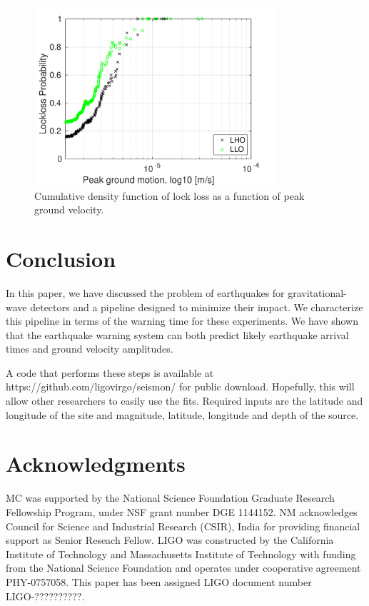 \documentclass[reprint, prl, aps, showpacs]{revtex4-1}
\begin{document}
\begin{figure}[t]
\hspace*{-0.5cm}
  \includegraphics[width=3.5in]{lockloss_vel.pdf}
 \caption{Cumulative density function of lock loss as a function of peak ground velocity.}
 \label{fig:locklossCDF}
\end{figure}

\section{Conclusion}
\label{sec:conclusions}

In this paper, we have discussed the problem of earthquakes for gravitational-wave detectors and a pipeline designed to minimize their impact. 
We characterize this pipeline in terms of the warning time for these experiments.
We have shown that the earthquake warning system can both predict likely earthquake arrival times and ground velocity amplitudes. 

A code that performs these steps is available at https://github.com/ligovirgo/seismon/ for public download. Hopefully, this will allow other researchers to easily use the fits. Required inputs are the latitude and longitude of the site and magnitude, latitude, longitude and depth of the source.

\section{Acknowledgments}
MC was supported by the National Science Foundation Graduate Research Fellowship
Program, under NSF grant number DGE 1144152. 
NM acknowledges Council for Science and Industrial Research (CSIR), India for providing financial support as Senior Reseach Fellow.  
LIGO was constructed by the California Institute of Technology and Massachusetts Institute of Technology with funding from the National Science Foundation and operates under cooperative agreement PHY-0757058.
This paper has been assigned LIGO document number LIGO-??????????.



\end{document}
